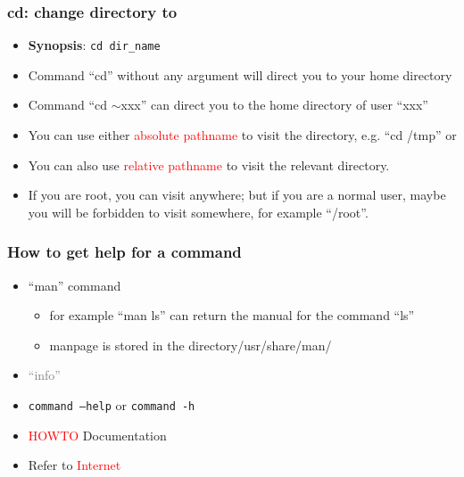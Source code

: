 \documentclass[red]{beamer}
\begin{document}
\begin{CJK*}{GBK}{kai}
\begin{frame}
\frametitle{cd: change directory to}
\begin{itemize}
    \item \textbf{Synopsis}: \texttt{cd dir\_name}
    \item Command ``cd'' without any argument will direct you to your home directory
    \item Command ``cd $\sim$xxx'' can direct you to the home directory of user ``xxx''
    \item You can use either \textcolor{red}{absolute pathname} to visit the directory, e.g. ``cd /tmp'' or
    \item You can also use \textcolor{red}{relative pathname} to visit the relevant directory.
    \item If you are root, you can visit anywhere; but if you are a normal user, maybe you will be
        forbidden to visit somewhere, for example ``/root''.
\end{itemize}
\end{frame}

\begin{frame}
\frametitle{How to get help for a command}
\begin{itemize}
    \item ``man'' command
    \begin{itemize}
        \item for example ``man ls'' can return the manual for the command ``ls''
        \item manpage is stored in the directory/usr/share/man/
    \end{itemize}
    \item \textcolor{gray}{``info''}
    \item \texttt{command --help} or \texttt{command -h}
    \item \textcolor{red}{HOWTO} Documentation
    \item Refer to \textcolor{red}{Internet}
\end{itemize}
\end{frame}


\end{CJK*}
\end{document}
